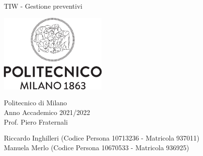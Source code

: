 \begin{titlepage}
	\begin{center}
		\vspace*{1cm}
		
		\Huge
		TIW - Gestione preventivi\\
		\vspace{4cm}
		
		\includegraphics[width=0.4\textwidth]{polimilogo}
		
		\vspace{3.5cm}
		\LARGE
		Politecnico di Milano\\
		Anno Accademico 2021/2022\\
		\vspace{0.5cm}
		\Large
		Prof. Piero Fraternali\\
		
		\vspace{5cm}
		
		{Riccardo Inghilleri (Codice Persona 10713236 - Matricola 937011)\\Manuela Merlo (Codice Persona 10670533 - Matricola 936925)}
		
		\vfill
		
		\vspace{0.8cm}
		
	\end{center}
\end{titlepage}